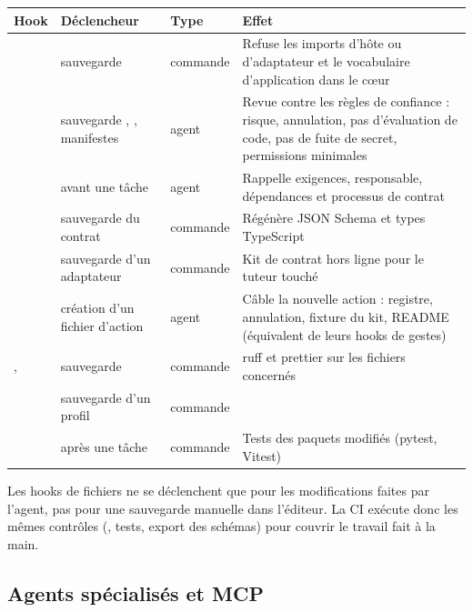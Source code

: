 {\small\setlength{\tabcolsep}{4pt}
\begin{xltabular}{\textwidth}{@{}L{4.2cm}L{2.4cm}L{1.4cm}Y@{}}
\toprule
\textbf{Hook} & \textbf{Déclencheur} & \textbf{Type} & \textbf{Effet} \\
\midrule
{} & sauvegarde  & commande & Refuse les imports d'hôte ou d'adaptateur et le vocabulaire d'application dans le cœur \\
 & sauvegarde , , manifestes & agent & Revue contre les règles de confiance : risque, annulation, pas d'évaluation de code, pas de fuite de secret, permissions minimales \\
 & avant une tâche & agent & Rappelle exigences, responsable, dépendances et processus de contrat \\
 & sauvegarde du contrat & commande & Régénère JSON Schema et types TypeScript \\
 & sauvegarde d'un adaptateur & commande & Kit de contrat hors ligne pour le tuteur touché \\
 & création d'un fichier d'action & agent & Câble la nouvelle action : registre, annulation, fixture du kit, README (équivalent de leurs hooks de gestes) \\
,  & sauvegarde & commande & ruff et prettier sur les fichiers concernés \\
 & sauvegarde d'un profil & commande &  \\
 & après une tâche & commande & Tests des paquets modifiés (pytest, Vitest) \\
\bottomrule
\end{xltabular}}

\begin{notebox}
\small Les hooks de fichiers ne se déclenchent que pour les modifications faites par l'agent, pas pour une sauvegarde manuelle dans l'éditeur. La CI exécute donc les mêmes contrôles (, tests, export des schémas) pour couvrir le travail fait à la main.
\end{notebox}

\subsection{Agents spécialisés et MCP}

